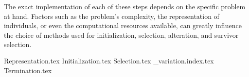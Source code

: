   The exact implementation of each of these steps depends on the specific problem at hand. Factors such as the 
  problem's complexity, the representation of individuals, or even the computational resources available, can greatly 
  influence the choice of methods used for initialization, selection, alteration, and survivor selection.

  {Representation.tex}
  {Initialization.tex}
  {Selection.tex}
  {_variation.index.tex}
  {Termination.tex}
